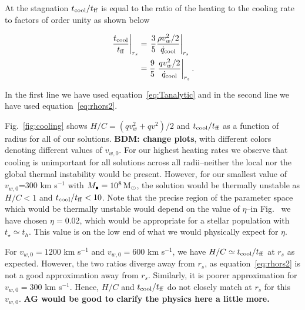 \documentclass[usenatbib,fleqn]{mn2e}
\newcommand\lsim{\mathrel{\rlap{\lower4pt\hbox{\hskip1pt$\sim$}}
    \raise1pt\hbox{$<$}}}
\newcommand\gsim{\mathrel{\rlap{\lower4pt\hbox{\hskip1pt$\sim$}}
    \raise1pt\hbox{$>$}}}
\newcommand{\rs}{r_s}
\newcommand{\vw}{v_w}
\newcommand{\Mbh}[1][]{M_{\bullet#1}}
\newcommand{\vwO}{v_{w,0}}
\newcommand{\tage}{t_{\star}}
\renewcommand{\th}{t_h}
\newcommand{\tcool}{t_{\rm cool}}
\newcommand{\tff}{t_{\rm ff}}
\begin{document}
At the stagnation $\tcool/\tff$ is equal to the ratio of the heating to
the cooling rate to factors of order unity as shown below 

\begin{align}
\left. \frac{\tcool}{\tff}\right|_{\rs}&=\left. \frac{3}{5} \frac{\rho 
  \vw^2/2}{\dot{q}_{\rm cool}}\right|_{\rs}\\
&=\frac{9}{5} \left. \frac{q \vw^2/2}{\dot{q}_{\rm cool}}\right|_{\rs}.
\end{align}

In the first line we have used equation~\eqref{eq:Tanalytic} and in
the second line we have used equation~\eqref{eq:rhors2}. 

Fig.~\ref{fig:cooling} shows $H/C=(q \vw^2+q v^2)/2$ and $\tcool/\tff$
as a function of radius for all of our solutions. {\bf BDM: change
  plots}, with different colors denoting different values of $\vwO$.
For our highest heating rates we observe that cooling is unimportant
for all solutions across all radii--neither the local nor the global
thermal instability would be present. However,  for our smallest value
of $\vwO$=300 km s$^{-1}$ with $\Mbh=10^8 \Msun$, the solution would be
thermally unstable as $H/C<1$ and $\tcool/\tff<10$. Note that the
precise region of the parameter space which would be thermally
unstable would depend on the value of $\eta$--in
Fig.~\pageref{fig:cooling} we have chosen $\eta=0.02$, which would be
appropriate for a stellar population with $\tage\simeq \th$. This
value is on the low end of what we would physically expect for
$\eta$. 

For $\vwO=1200$ km s$^{-1}$ and $\vwO=600$ km s$^{-1}$, we have
$H/C\simeq\tcool/\tff$ at $\rs$ as expected. However, the two ratios
diverge away from $\rs$, as equation~\eqref{eq:rhors2} is not a good
approximation away from $\rs$. Similarly, it is poorer approximation
for $\vwO=300$ km s$^{-1}$. Hence, $H/C$ and $\tcool/\tff$ do not
closely match at $\rs$ for this $\vwO$. {\bf AG would be good to
  clarify the physics here a little more.}


\end{document}
